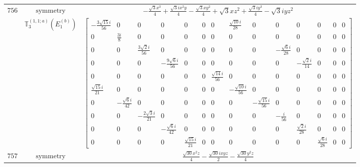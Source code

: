 \documentclass[fleqn,8pt,landscape]{jsarticle}
\begin{document}
\begin{longtable}{ccc}
$ 756 $ & $ \text{symmetry} $ & $ - \frac{\sqrt{3} x^{3}}{4} + \frac{\sqrt{3} i x^{2} y}{4} - \frac{\sqrt{3} x y^{2}}{4} + \sqrt{3} x z^{2} + \frac{\sqrt{3} i y^{3}}{4} - \sqrt{3} i y z^{2} $ \\
$  $ & $ \mathbb{T}_{3}^{(1,1;a)}(E_{1}^{(b)}) $ & $ \begin{bmatrix} - \frac{3 \sqrt{15} i}{56} & 0 & 0 & 0 & 0 & 0 & 0 & \frac{\sqrt{10} i}{28} & 0 & 0 & 0 & 0 & 0 & 0 \\ 0 & \frac{3 i}{8} & 0 & 0 & 0 & 0 & 0 & 0 & 0 & 0 & 0 & 0 & 0 & 0 \\ 0 & 0 & \frac{3 \sqrt{2} i}{56} & 0 & 0 & 0 & 0 & 0 & 0 & - \frac{\sqrt{6} i}{28} & 0 & 0 & 0 & 0 \\ 0 & 0 & 0 & - \frac{9 \sqrt{6} i}{56} & 0 & 0 & 0 & 0 & 0 & 0 & - \frac{\sqrt{2} i}{14} & 0 & 0 & 0 \\ 0 & 0 & 0 & 0 & 0 & 0 & \frac{\sqrt{14} i}{56} & 0 & 0 & 0 & 0 & 0 & 0 & 0 \\ \frac{\sqrt{15} i}{21} & 0 & 0 & 0 & 0 & 0 & 0 & - \frac{\sqrt{10} i}{56} & 0 & 0 & 0 & 0 & 0 & 0 \\ 0 & - \frac{\sqrt{6} i}{42} & 0 & 0 & 0 & 0 & 0 & 0 & - \frac{\sqrt{15} i}{56} & 0 & 0 & 0 & 0 & 0 \\ 0 & 0 & - \frac{2 \sqrt{3} i}{21} & 0 & 0 & 0 & 0 & 0 & 0 & - \frac{i}{56} & 0 & 0 & 0 & 0 \\ 0 & 0 & 0 & - \frac{\sqrt{6} i}{42} & 0 & 0 & 0 & 0 & 0 & 0 & \frac{\sqrt{2} i}{28} & 0 & 0 & 0 \\ 0 & 0 & 0 & 0 & \frac{\sqrt{15} i}{21} & 0 & 0 & 0 & 0 & 0 & 0 & \frac{\sqrt{6} i}{28} & 0 & 0 \end{bmatrix} $ \\ \hline
$ 757 $ & $ \text{symmetry} $ & $ \frac{\sqrt{30} x^{2} z}{4} - \frac{\sqrt{30} i x y z}{2} - \frac{\sqrt{30} y^{2} z}{4} $ \\

\end{longtable}
\end{document}
